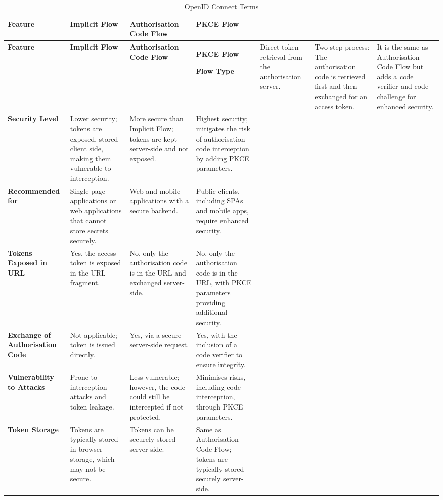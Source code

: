 \begin{longtable}{|>{\raggedright\arraybackslash}p{4cm}|>{\raggedright\arraybackslash}p{3.5cm}|>{\raggedright\arraybackslash}p{3.5cm}|>{\raggedright\arraybackslash}p{3.5cm}|}
    \caption{OpenID Connect Terms}
    \label{table:oauth_terms}
\hline
{}
\textbf{Feature} & \textbf{Implicit Flow} & \textbf{Authorisation Code Flow} & \textbf{PKCE Flow} \\ \hline
\endfirsthead
\hline
{}
\textbf{Feature} & \textbf{Implicit Flow} & \textbf{Authorisation Code Flow} & \textbf{PKCE Flow} 
\endhead
\hline
\endfoot
\hline
\endlastfoot

\textbf{Flow Type} & Direct token retrieval from the authorisation server. & Two-step process: The authorisation code is retrieved first and then exchanged for an access token. & It is the same as Authorisation Code Flow but adds a code verifier and code challenge for enhanced security. \\ \hline
\textbf{Security Level} & Lower security; tokens are exposed,  stored client side, making them vulnerable to interception. & More secure than Implicit Flow; tokens are kept server-side and not exposed. & Highest security; mitigates the risk of authorisation code interception by adding PKCE parameters. \\ \hline
\textbf{Recommended for} & Single-page applications or web applications that cannot store secrets securely. & Web and mobile applications with a secure backend. & Public clients, including SPAs and mobile apps, require enhanced security. \\ \hline
\textbf{Tokens Exposed in URL} & Yes, the access token is exposed in the URL fragment. & No, only the authorisation code is in the URL and exchanged server-side. & No, only the authorisation code is in the URL, with PKCE parameters providing additional security. \\ \hline
\textbf{Exchange of Authorisation Code} & Not applicable; token is issued directly. & Yes, via a secure server-side request. & Yes, with the inclusion of a code verifier to ensure integrity. \\ \hline
\textbf{Vulnerability to Attacks} & Prone to interception attacks and token leakage. & Less vulnerable; however, the code could still be intercepted if not protected. & Minimises risks, including code interception, through PKCE parameters. \\ \hline
\textbf{Token Storage} & Tokens are typically stored in browser storage, which may not be secure. & Tokens can be securely stored server-side. & Same as Authorisation Code Flow; tokens are typically stored securely server-side. \\ \hline
\end{longtable}
\endgroup

